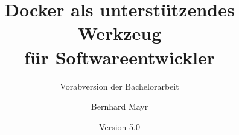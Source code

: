 \documentclass[a4paper, ngerman, bibliography=totoc]{scrreprt}  %
\title{Docker als unterstützendes Werkzeug\\für Softwareentwickler}
\subtitle{Vorabversion der Bachelorarbeit}
\author{Bernhard Mayr}
\date{Version 5.0}
\begin{document}
\maketitle


\tableofcontents






\listoffigures{}
\lstlistoflistings{}
\printbibliography{}
\end{document}

